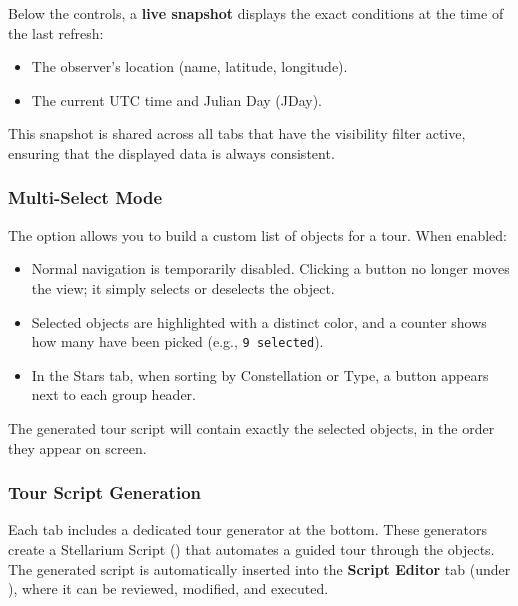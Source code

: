 Below the controls, a \textbf{live snapshot} displays the exact conditions at the time of the last refresh:
\begin{itemize}
\item The observer's location (name, latitude, longitude).
\item The current UTC time and Julian Day (JDay).
\end{itemize}
This snapshot is shared across all tabs that have the visibility filter active, ensuring that the displayed data is always consistent.

\subsubsection{Multi-Select Mode}
\label{sec:SkyCulture:MultiSelect}

The  option allows you to build a custom list of objects for a tour. When enabled:
\begin{itemize}
\item Normal navigation is temporarily disabled. Clicking a button no longer moves the view; it simply selects or deselects the object.
\item Selected objects are highlighted with a distinct color, and a counter shows how many have been picked (e.g., \texttt{9 selected}).
\item In the Stars tab, when sorting by Constellation or Type, a  button appears next to each group header.
\end{itemize}
The generated tour script will contain exactly the selected objects, in the order they appear on screen.

\subsubsection{Tour Script Generation}
\label{sec:SkyCulture:TourGenerator}

Each tab includes a dedicated tour generator at the bottom. These generators create a Stellarium Script () that automates a guided tour through the objects. The generated script is automatically inserted into the \textbf{Script Editor} tab (under ), where it can be reviewed, modified, and executed.

